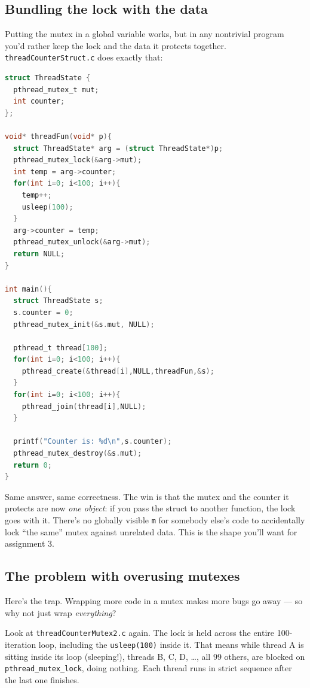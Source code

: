 \documentclass[11pt]{article}
\begin{document}
\subsection*{Bundling the lock with the data}

Putting the mutex in a global variable works, but in any nontrivial
program you'd rather keep the lock and the data it protects together.
\texttt{threadCounterStruct.c} does exactly that:

\begin{lstlisting}[language=C]
struct ThreadState {
  pthread_mutex_t mut;
  int counter;
};

void* threadFun(void* p){
  struct ThreadState* arg = (struct ThreadState*)p;
  pthread_mutex_lock(&arg->mut);
  int temp = arg->counter;
  for(int i=0; i<100; i++){
    temp++;
    usleep(100);
  }
  arg->counter = temp;
  pthread_mutex_unlock(&arg->mut);
  return NULL;
}

int main(){
  struct ThreadState s;
  s.counter = 0;
  pthread_mutex_init(&s.mut, NULL);

  pthread_t thread[100];
  for(int i=0; i<100; i++){
    pthread_create(&thread[i],NULL,threadFun,&s);
  }
  for(int i=0; i<100; i++){
    pthread_join(thread[i],NULL);
  }

  printf("Counter is: %d\n",s.counter);
  pthread_mutex_destroy(&s.mut);
  return 0;
}
\end{lstlisting}

Same answer, same correctness. The win is that the mutex and the
counter it protects are now \emph{one object}: if you pass the struct
to another function, the lock goes with it. There's no globally
visible \texttt{m} for somebody else's code to accidentally lock
``the same'' mutex against unrelated data. This is the shape you'll
want for assignment 3.

\subsection*{The problem with overusing mutexes}

Here's the trap. Wrapping more code in a mutex makes more bugs go
away --- so why not just wrap \emph{everything}?

Look at \texttt{threadCounterMutex2.c} again. The lock is held across
the entire 100-iteration loop, including the \texttt{usleep(100)}
inside it. That means while thread A is sitting inside its loop
(sleeping!), threads B, C, D, \ldots, all 99 others, are blocked on
\texttt{pthread\_mutex\_lock}, doing nothing. Each thread runs in
strict sequence after the last one finishes.
\end{document}
